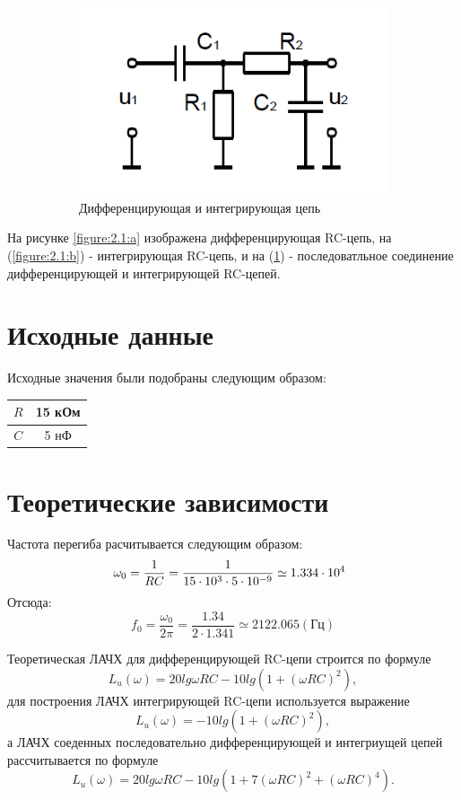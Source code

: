 \begin{figure}[h]
\begin{subfigure}[b]{0.3\textwidth}
\includegraphics[scale=0.4]{v_scheme.png}
\caption{Дифференцирующая и интегрирующая цепь}\label{figure:2.1:c}
\end{subfigure}
\caption{}\label{figure:2.1}
\end{figure}
На рисунке \ref{figure:2.1:a} изображена дифференцирующая RC-цепь, на (\ref{figure:2.1:b}) - интегрирующая RC-цепь, и на  (\ref{figure:2.1:c}) - последоватльное соединение дифференцирующей и интегрирующей RC-­цепей.


\section{Исходные данные}
Исходные значения были подобраны следующим образом:
\begin{center}
\begin{tabular}{|c|c|}
\hline 
$R$ & 15 кОм \\ 
\hline 
$C$ & 5 нФ \\ 
\hline 
\end{tabular}  
\end{center}


\section{Теоретические зависимости}
Частота перегиба расчитывается следующим образом:
\begin{equation}
\omega_0 = \frac{1}{RC} = \frac{1}{15 \cdot 10^3 \cdot 5 \cdot 10^{-9}} \simeq 1.334 \cdot 10^4 \hspace*{2mm}
\end{equation}
Отсюда: 
\begin{equation}
f_0 = \frac{\omega_0}{2 \pi} = \frac{1.34}{2\cdot1.341} \simeq 2122.065 (\text{Гц})
\end{equation}

Теоретическая ЛАЧХ для дифференцирующей RC-цепи строится по
формуле
\begin{equation}
L_u(\omega) = 20lg \omega RC - 10lg(1+(\omega RC)^2),
\end{equation}
для построения ЛАЧХ интегрирующей RC-цепи используется выражение
\begin{equation}
L_u(\omega) = -10lg(1+(\omega RC)^2),
\end{equation}
а ЛАЧХ соеденных последовательно дифференцирующей и интегриущей цепей рассчитывается по формуле
\begin{equation}
L_u(\omega) = 20lg \omega RC - 10lg(1+7(\omega RC)^2 + (\omega RC)^4).
\end{equation}


